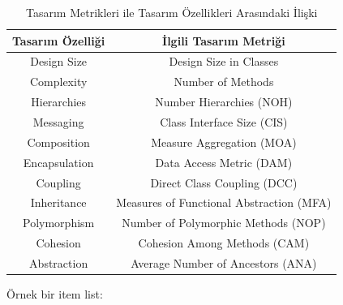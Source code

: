 \documentclass[conference]{IEEEtran}
\begin{document}
\begin{table}[h]
	\centering
	\begin{tabular}{|c|c|}
		\hline
		\textbf{Tasarım Özelliği}	& \textbf{İlgili Tasarım Metriği}\\
		\hline
		Design Size	& Design Size in Classes\\
		\hline
		Complexity & Number of Methods\\
		\hline
		Hierarchies & Number Hierarchies (NOH)\\
		\hline
		Messaging & Class  Interface Size (CIS)\\
		\hline
		Composition & Measure  Aggregation (MOA)\\
		\hline
		Encapsulation & Data Access Metric (DAM)\\
		\hline
		Coupling & Direct Class Coupling (DCC)\\
		\hline
		Inheritance & Measures of Functional Abstraction (MFA)\\
		\hline
		Polymorphism & Number of Polymorphic Methods (NOP)\\
		\hline
		Cohesion & Cohesion Among Methods (CAM)\\
		\hline
		Abstraction & Average Number of Ancestors (ANA)\\
		\hline


		
	\end{tabular}
	\caption{Tasarım Metrikleri ile Tasarım Özellikleri Arasındaki İlişki}
	\label{table:1}
\end{table}
Örnek bir item list:
\end{document}

